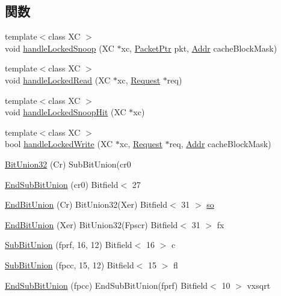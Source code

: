 \subsection*{関数}
\begin{DoxyCompactItemize}
\item 
{\footnotesize template$<$class XC $>$ }\\void \hyperlink{namespacePowerISA_ad52b48fd509cd387fe57295ec645bed4}{handleLockedSnoop} (XC $\ast$xc, \hyperlink{classPacket}{PacketPtr} pkt, \hyperlink{base_2types_8hh_af1bb03d6a4ee096394a6749f0a169232}{Addr} cacheBlockMask)
\item 
{\footnotesize template$<$class XC $>$ }\\void \hyperlink{namespacePowerISA_ac16f0956cb4e3cb6d1bd24521a98c685}{handleLockedRead} (XC $\ast$xc, \hyperlink{classRequest}{Request} $\ast$req)
\item 
{\footnotesize template$<$class XC $>$ }\\void \hyperlink{namespacePowerISA_a00b74daf755bc384492e358e2513c483}{handleLockedSnoopHit} (XC $\ast$xc)
\item 
{\footnotesize template$<$class XC $>$ }\\bool \hyperlink{namespacePowerISA_a48135f3506457de36b02058e971a04ea}{handleLockedWrite} (XC $\ast$xc, \hyperlink{classRequest}{Request} $\ast$req, \hyperlink{base_2types_8hh_af1bb03d6a4ee096394a6749f0a169232}{Addr} cacheBlockMask)
\item 
\hyperlink{namespacePowerISA_ada69dcc10a02a7ceda35af957c434551}{BitUnion32} (Cr) SubBitUnion(cr0
\item 
\hyperlink{namespacePowerISA_ae2d645019d37ae932cad3b1435ebe638}{EndSubBitUnion} (cr0) Bitfield$<$ 27
\item 
\hyperlink{namespacePowerISA_a4a1bb83cbbdd34b9536fd20979976f34}{EndBitUnion} (Cr) BitUnion32(Xer) Bitfield$<$ 31 $>$ \hyperlink{namespacePowerISA_afe7194d4c241ed83e4a1f9cdc8e7be0d}{so}
\item 
\hyperlink{namespacePowerISA_ac66016fe59d55012354269c3c5af1d1e}{EndBitUnion} (Xer) BitUnion32(Fpscr) Bitfield$<$ 31 $>$ fx
\item 
\hyperlink{namespacePowerISA_a8751f506ec057d848f6276c80b7c5f78}{SubBitUnion} (fprf, 16, 12) Bitfield$<$ 16 $>$ c
\item 
\hyperlink{namespacePowerISA_ab41ae2df93e0b6619beec050ee522e8d}{SubBitUnion} (fpcc, 15, 12) Bitfield$<$ 15 $>$ fl
\item 
\hyperlink{namespacePowerISA_aed02f125b7f5d4836bf0489108247f55}{EndSubBitUnion} (fpcc) EndSubBitUnion(fprf) Bitfield$<$ 10 $>$ vxsqrt

\end{DoxyCompactItemize}
